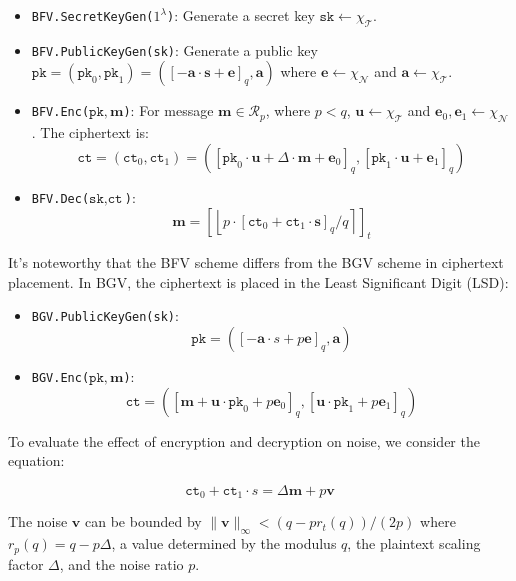 \documentclass[11pt]{article}
\begin{document}
\begin{itemize}
\item \texttt{BFV.SecretKeyGen($1^\lambda$)}: Generate a secret key $\texttt{sk}\leftarrow \chi_\mathcal{T}$.
\item \texttt{BFV.PublicKeyGen(\texttt{sk})}: Generate a public key $\texttt{pk} =(\texttt{pk}_0,\texttt{pk}_1)= \left([-\mathbf{a}\cdot\mathbf{s}+\mathbf{e}]_{q}, \mathbf{a}\right)$ where $\mathbf{e}\leftarrow \chi_\mathcal{N}$ and $\mathbf{a}\leftarrow \chi_\mathcal{T}$.
\item \texttt{BFV.Enc($\texttt{pk},\mathbf{m}$)}: For message $\mathbf{m}\in \mathcal{R}_p$, where $p<q$, $\mathbf{u}\leftarrow \chi_\mathcal{T}$ and $\mathbf{e}_0, \mathbf{e}_1\leftarrow \chi_\mathcal{N}$. The ciphertext is:
    $$\texttt{ct} = (\texttt{ct}_0,\texttt{ct}_1)=\left([\texttt{pk}_0\cdot\mathbf{u}+\Delta\cdot\mathbf{m}+\mathbf{e}_0]_{q},[\texttt{pk}_1\cdot\mathbf{u}+\mathbf{e}_1]_{q}\right)$$
\item \texttt{BFV.Dec($\texttt{sk},\texttt{ct}$)}:
    $$\mathbf{m}=\left[\left\lfloor p\cdot[\texttt{ct}_0+\texttt{ct}_1\cdot\mathbf{s}]_q/q\right\rceil\right]_t$$
\end{itemize}

It's noteworthy that the BFV scheme differs from the BGV scheme\cite{brakerski2014leveled} in ciphertext placement. In BGV, the ciphertext is placed in the Least Significant Digit (LSD):

\begin{itemize}
\item \texttt{BGV.PublicKeyGen(\texttt{sk})}: $$\texttt{pk}=([-\mathbf{a}\cdot{s}+p\mathbf{e}]_q, \mathbf{a})$$
\item \texttt{BGV.Enc($\texttt{pk},\mathbf{m}$)}: $$\texttt{ct}=([ \mathbf{m}+\mathbf{u}\cdot\texttt{pk}_0+p\mathbf{e}_0]_q,[\mathbf{u}\cdot\texttt{pk}_1+p\mathbf{e}_1]_q)$$
\end{itemize}

To evaluate the effect of encryption and decryption on noise, we consider the equation:

\begin{equation}
\texttt{ct}_0+\texttt{ct}_1\cdot{s}=\Delta\mathbf{m}+p\mathbf{v}
\end{equation}

The noise $\mathbf{v}$ can be bounded by $\lVert\mathbf{v}\rVert_\infty < (q-p r_t(q))/(2p)$ where $r_p(q)=q-p\Delta$, a value determined by the modulus $q$, the plaintext scaling factor $\Delta$, and the noise ratio $p$.
\end{document}
